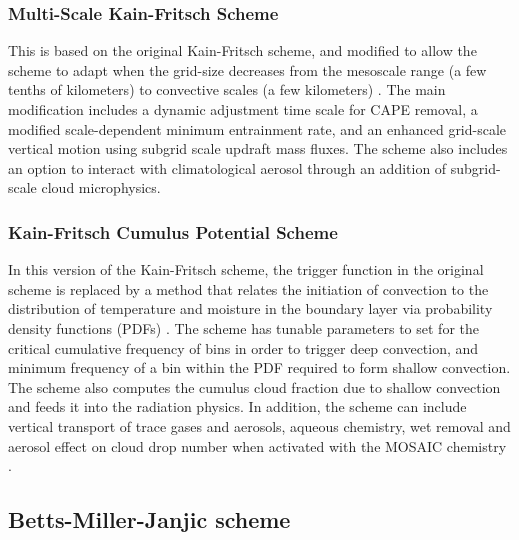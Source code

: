 \subsubsection{Multi-Scale Kain-Fritsch Scheme}

This is based on the original Kain-Fritsch scheme, and modified to allow 
the scheme to adapt when the grid-size decreases from the mesoscale range (a few tenths 
of kilometers) to convective scales (a few kilometers) \citep{zheng16}. The main modification includes 
a dynamic adjustment time scale for CAPE removal, a modified scale-dependent minimum 
entrainment rate, and an enhanced grid-scale vertical motion using subgrid scale updraft 
mass fluxes. The scheme also includes an option to interact with climatological 
aerosol through an addition of subgrid-scale cloud microphysics.

\subsubsection{Kain-Fritsch Cumulus Potential Scheme}

In this version of the Kain-Fritsch scheme, the trigger function in the original scheme 
is replaced by a method that relates the initiation of convection to the distribution of 
temperature and moisture in the boundary layer via probability density functions (PDFs)
\citep{berg13}. The scheme has tunable 
parameters to set for the critical cumulative frequency of bins in order to trigger deep 
convection, and minimum frequency of a bin within the PDF required to form shallow convection. 
The scheme also computes the cumulus cloud fraction due to shallow convection and feeds it into 
the radiation physics. In addition, the scheme can include vertical transport of trace gases and 
aerosols, aqueous chemistry, wet removal and aerosol effect on cloud drop number when 
activated with the MOSAIC chemistry \citep{berg15}.


\subsection{Betts-Miller-Janjic scheme}

